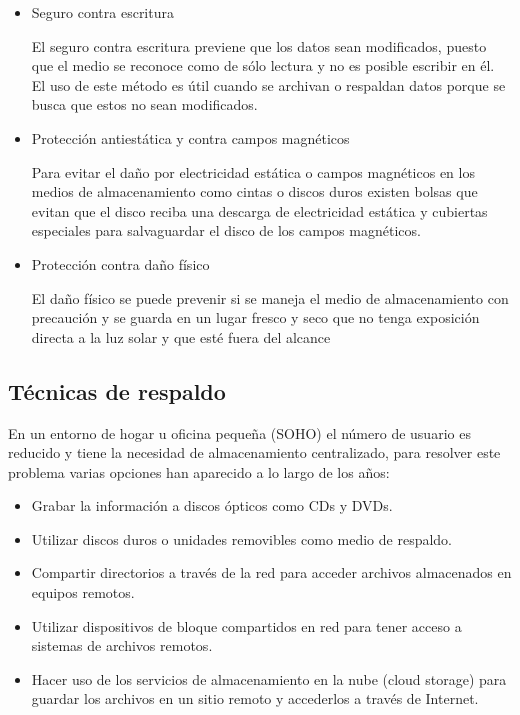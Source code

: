     \begin{itemize}

      \item Seguro contra escritura
        
El seguro contra escritura previene que los datos sean modificados, puesto que el medio se reconoce como de s\'{o}lo lectura y no es posible escribir en \'{e}l. El uso de este m\'{e}todo es \'{u}til cuando se archivan o respaldan datos porque se busca que estos no sean modificados.

      \item Protecci\'{o}n antiest\'{a}tica y contra campos magn\'{e}ticos
        
Para evitar el da\~{n}o por electricidad est\'{a}tica o campos magn\'{e}ticos en los medios de almacenamiento como cintas o discos duros existen bolsas que evitan que el disco reciba una descarga de electricidad est\'{a}tica y cubiertas especiales para salvaguardar el disco de los campos magn\'{e}ticos.

      \item Protecci\'{o}n contra da\~{n}o f\'{i}sico
       
El da\~{n}o f\'{i}sico se puede prevenir si se maneja el medio de almacenamiento con precauci\'{o}n y se guarda en un lugar fresco y seco que no tenga exposici\'{o}n directa a la luz solar y que est\'{e} fuera del alcance 

    \end{itemize}

  \subsection {T\'{e}cnicas de respaldo}
  

En un entorno de hogar u oficina peque\~{n}a (SOHO) el n\'{u}mero de usuario es reducido y tiene la necesidad de almacenamiento centralizado, para resolver este problema varias opciones han aparecido a lo largo de los a\~{n}os:

    \begin{itemize}
      \item Grabar la informaci\'{o}n a discos \'{o}pticos como CDs y DVDs.
      \item Utilizar discos duros o unidades removibles como medio de respaldo.
      \item Compartir directorios a trav\'{e}s de la red para acceder archivos almacenados en equipos remotos.
      \item Utilizar dispositivos de bloque compartidos en red para tener acceso a sistemas de archivos remotos.
      \item Hacer uso de los servicios de almacenamiento en la nube (cloud storage) para guardar los archivos en un sitio remoto y accederlos a trav\'{e}s de Internet.
    \end{itemize}

